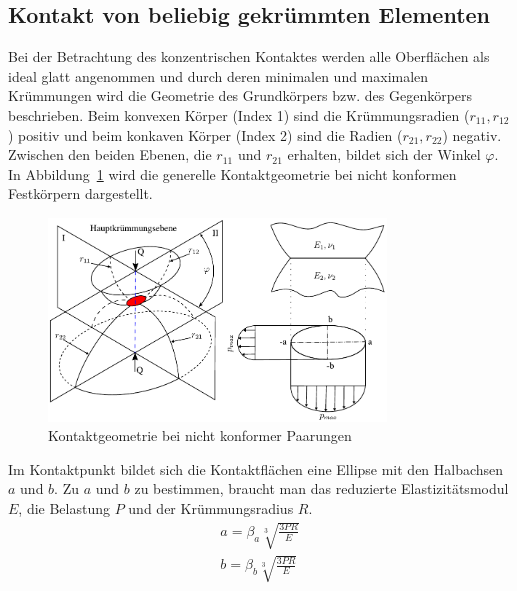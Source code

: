 \subsection{Kontakt von beliebig gekrümmten Elementen}
\label{sub:kontakt_von_beliebig_gekruemmten_elementen}

Bei der Betrachtung des konzentrischen Kontaktes werden alle Oberflächen als ideal glatt angenommen und durch deren minimalen und maximalen Krümmungen wird die Geometrie des Grundkörpers bzw. des Gegenkörpers beschrieben.
Beim konvexen Körper (Index 1) sind die Krümmungsradien ($r_{11}, r_{12}$) positiv und beim konkaven Körper (Index 2) sind die Radien ($r_{21}, r_{22}$) negativ.
Zwischen den beiden Ebenen, die $r_{11}$ und $r_{21}$ erhalten, bildet sich der Winkel $\varphi$.
In Abbildung~\ref{fig:kontaktgeometrie_nichtkonforme_kontakte} wird die generelle Kontaktgeometrie bei nicht konformen Festkörpern dargestellt.
\begin{figure}[htb]
    \centering
    \includegraphics[width=0.8\textwidth]{./images/Hertzsche_Pressung.pdf}
    \caption{Kontaktgeometrie bei nicht konformer Paarungen\cite{psm}}
    \label{fig:kontaktgeometrie_nichtkonforme_kontakte}
\end{figure}
%
Im Kontaktpunkt bildet sich die Kontaktflächen eine Ellipse mit den Halbachsen $a$ und $b$.
Zu $a$ und $b$ zu bestimmen, braucht man das reduzierte Elastizitätsmodul $E$, die Belastung $P$ und der Krümmungsradius $R$.
\begin{align}
    a = \beta_a  \sqrt[3]{\frac{3  P  R}{E}} \label{eq:laenge_a} \\
    b = \beta_b  \sqrt[3]{\frac{3  P  R}{E}} \label{eq:laenge_b}
\end{align}
